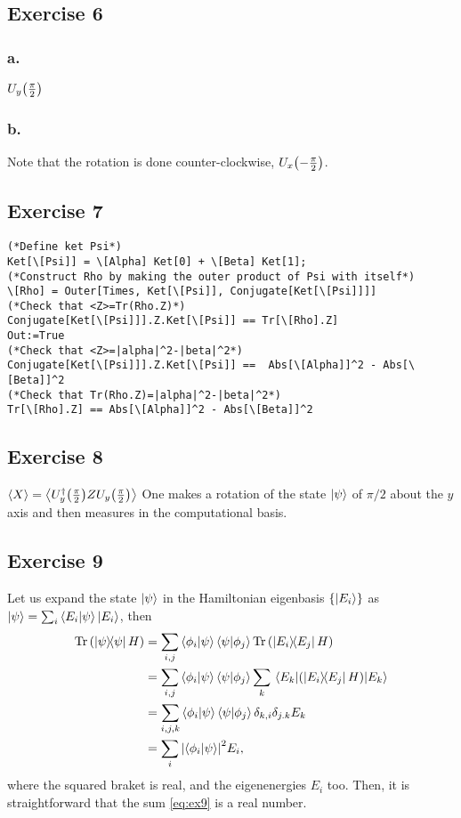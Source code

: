 \subsection{Exercise 6}\noindent
\subsubsection{a.}
$U_y\qty(\frac{\pi}{2})$

\subsubsection{b.}
Note that the rotation is done counter-clockwise, $U_x\qty(-\frac{\pi}{2})$.

\subsection{Exercise 7}
\begin{verbatim}
(*Define ket Psi*)
Ket[\[Psi]] = \[Alpha] Ket[0] + \[Beta] Ket[1];
(*Construct Rho by making the outer product of Psi with itself*)
\[Rho] = Outer[Times, Ket[\[Psi]], Conjugate[Ket[\[Psi]]]]
(*Check that <Z>=Tr(Rho.Z)*)
Conjugate[Ket[\[Psi]]].Z.Ket[\[Psi]] == Tr[\[Rho].Z]
Out:=True
(*Check that <Z>=|alpha|^2-|beta|^2*)
Conjugate[Ket[\[Psi]]].Z.Ket[\[Psi]] ==  Abs[\[Alpha]]^2 - Abs[\[Beta]]^2
(*Check that Tr(Rho.Z)=|alpha|^2-|beta|^2*)
Tr[\[Rho].Z] == Abs[\[Alpha]]^2 - Abs[\[Beta]]^2
\end{verbatim}

\subsection{Exercise 8}\noindent
$\expval{X}=\expval{U_y^{\dagger}\qty(\frac{\pi}{2})ZU_y\qty(\frac{\pi}{2})}$
One makes a rotation of the state $\ket{\psi}$ of $\pi/2$ about the $y$ axis and 
then measures in the computational basis.

\subsection{Exercise 9}\noindent
Let us expand the state $\ket{\psi}$ in the Hamiltonian eigenbasis $\qty{\ket{E_i}}$
as $\ket{\psi}=\sum_i\braket{E_i}{\psi}\ket{E_i}$, then
\begin{subequations}
\begin{align}
\Tr \qty(\dyad{\psi}{\psi}H)
&=\sum_{i,j}\braket{\phi_i}{\psi}\braket{\psi}{\phi_j}\Tr \qty(\dyad{E_i}{E_j}H)\\
&=\sum_{i,j}\braket{\phi_i}{\psi}\braket{\psi}{\phi_j}\sum_k 
\matrixel{E_k}{\qty(\dyad{E_i}{E_j}H)}{E_k}\\
&=\sum_{i,j,k}\braket{\phi_i}{\psi}\braket{\psi}{\phi_j} \delta_{k,i}\delta_{j.k}E_k\\
&=\sum_i\abs{\braket{\phi_i}{\psi}}^2 E_i,\label{eq:ex9}
\end{align}
\end{subequations}
where the squared braket is real, and the eigenenergies $E_i$ too. Then, it is straightforward 
that the sum \eqref{eq:ex9} is a real number.

